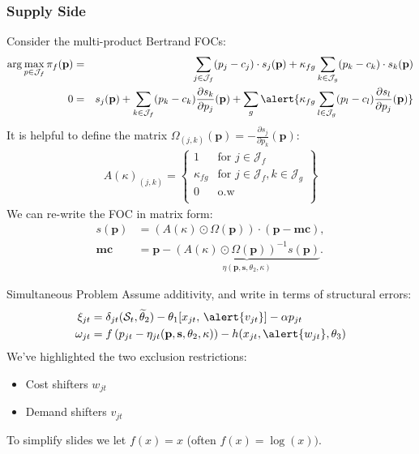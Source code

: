 \documentclass[xcolor=pdftex,dvipsnames,table,mathserif,aspectratio=169]{beamer}
\begin{document}
\begin{frame}[plain]
\frametitle{Supply Side}
Consider the multi-product Bertrand FOCs:
\footnotesize
{\begin{eqnarray*}
\arg \max_{p \in \mathcal{J}_f} \pi_f (\mathbf{p}) &=& \sum_{j \in \mathcal{J}_f} (p_j - c_j) \cdot s_j(\mathbf{p}) +  \kappa_{fg}\sum_{k \in \mathcal{J}_g} (p_k - c_k) \cdot s_k(\mathbf{p}) \\
0&=& s_j(\mathbf{p}) + \sum_{k \in \mathcal{J}_f} (p_k - c_k) \frac{\partial s_{k}}{\partial p_j}(\mathbf{p}) + \sum_g  \alert{\kappa_{fg} \sum_{l \in \mathcal{J}_g} (p_l - c_l) \frac{\partial s_{l}}{\partial p_j}(\mathbf{p})}\\
\end{eqnarray*}
}
It is helpful to define the matrix $\Omega_{(j,k)}(\mathbf{p})  = - \frac{\partial s_{j}}{\partial p_k}(\mathbf{p})$:
\begin{eqnarray*}
A(\kappa)_{(j,k)} = \left\{\begin{array}{lr}
          1 & \text{for }  j \in \mathcal{J}_f \\ 
       	  \kappa_{fg} & \text{for }  j \in \mathcal{J}_f, k \in \mathcal{J}_g\\
	  0 & \text{o.w}\\
        \end{array} \right\}
\end{eqnarray*}
We can re-write the FOC in matrix form:
\begin{eqnarray*}
        s(\mathbf{p}) &= (A(\kappa) \odot \Omega(\mathbf{p})) \cdot (\mathbf{p} - \mathbf{mc}), \\
       \mathbf{mc} &=  \mathbf{p} - \underbrace{(A(\kappa) \odot \Omega(\mathbf{p}))^{-1} s(\mathbf{p})}_{\eta(\mathbf{p},\mathbf{s},\theta_2,\kappa)}.
\end{eqnarray*}
\end{frame}

\begin{frame}{Simultaneous Problem}
Assume additivity, and write in terms of structural errors:
\begin{align*}
\xi_{jt} &=\delta_{jt}(\mathcal{S}_t,\widetilde{\theta}_2) - \theta_1[x_{jt}, \, \alert{v_{jt}}] - \alpha p_{jt} \\
\omega_{jt} &= f \left( p_{jt} - \eta_{jt}(\mathbf{p},\mathbf{s},\theta_2,\kappa) \right) - h(x_{jt}, \alert{w_{jt}},\theta_3)
\end{align*}
We've highlighted the two \alert{exclusion restrictions}:
\begin{itemize}
\item Cost shifters $w_{jt}$
\item Demand shifters $v_{jt}$
\end{itemize}
To simplify slides we let $f(x)=x$ (often $f(x) =\log(x))$.
\end{frame}
\end{document}
